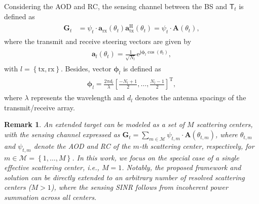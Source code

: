 \documentclass[10pt,journal,compsoc]{IEEEtran}
\theoremstyle{myremark}
\newtheorem{remark}{Remark}
\theoremstyle{myexample}
\begin{document}
Considering the \gls{AOD} and \gls{RC}, the sensing channel between the \gls{BS} and $ \mathsf{T}_t $ is defined as
\begin{align} \label{eqn:response-matrix}
	\begin{aligned}
	\mathbf{G}_t & = \psi_t \cdot \mathbf{a}_\mathrm{rx} \left( \theta_t \right) \mathbf{a}^\mathrm{H}_\mathrm{tx} \left( \theta_t \right) 
	 = \psi_t \cdot \mathbf{A} \left( \theta_t \right),
	\end{aligned}
\end{align}
where the transmit and receive steering vectors are given by
\begin{align} \label{eqn:steering-vectors}
	\begin{aligned}
		\mathbf{a}_{l} \left( \theta_t \right) = \tfrac{1}{\sqrt{N_l}} \mathrm{e}^{\mathrm{j} \boldsymbol{\phi}_l \cos \left( \theta_t \right)},
	\end{aligned}
\end{align}
with $ l  = \left\lbrace \mathrm{tx}, \mathrm{rx} \right\rbrace $. Besides, vector $ \boldsymbol{\phi}_l $ is defined as
\begin{align} \label{eqn:steering-angles}
	\begin{aligned}
		\boldsymbol{\phi}_l = \tfrac{2 \pi d_l}{\lambda} \left[  \tfrac{-N_l+1}{2}, \dots,  \tfrac{N_l-1}{2} \right]^\mathrm{T},
	\end{aligned}
\end{align}
where $ \lambda $ represents the wavelength and $ d_l $ denotes the antenna spacings of the transmit/receive array.


\begin{remark} \label{rmk:clarification-point-scatter}
	An extended target can be modeled as a set of $ M $ scattering centers, with the sensing channel expressed as $ \mathbf{G}_t = \sum_{m \in \mathcal{M}} \psi_{t,m} \cdot \mathbf{A} \left( \theta_{t,m} \right) $, where $ \theta_{t,m} $ and $ \psi_{t,m} $ denote the AOD and RC of the $m$-th scattering center, respectively, for $ m \in \mathcal{M} = \left\lbrace 1, \dots, M \right\rbrace $. In this work, we focus on the special case of a single effective scattering center, i.e., $ M = 1 $. Notably, the proposed framework and solution can be directly extended to an arbitrary number of resolved scattering centers ($ M > 1 $), where the sensing SINR follows from incoherent power summation across all centers.
\end{remark}
\end{document}
